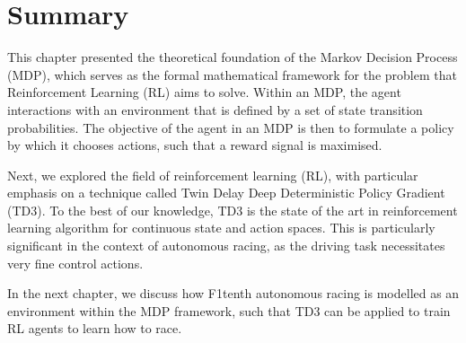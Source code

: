 \section{Summary}

This chapter presented the theoretical foundation of the Markov Decision Process (MDP), which serves as the formal mathematical framework for the problem that Reinforcement Learning (RL) aims to solve.
Within an MDP, the agent interactions with an environment that is defined by a set of state transition probabilities. 
The objective of the agent in an MDP is then to formulate a policy by which it chooses actions, such that a reward signal is maximised.


Next, we explored the field of reinforcement learning (RL), with particular emphasis on a technique called Twin Delay Deep Deterministic Policy Gradient (TD3). 
To the best of our knowledge, TD3 is the state of the art in reinforcement learning algorithm for continuous state and action spaces.
This is particularly significant in the context of autonomous racing, as the driving task necessitates very fine control actions.


In the next chapter, we discuss how F1tenth autonomous racing is modelled as an environment within the MDP framework, such that TD3 can be applied to train RL agents to learn how to race.

